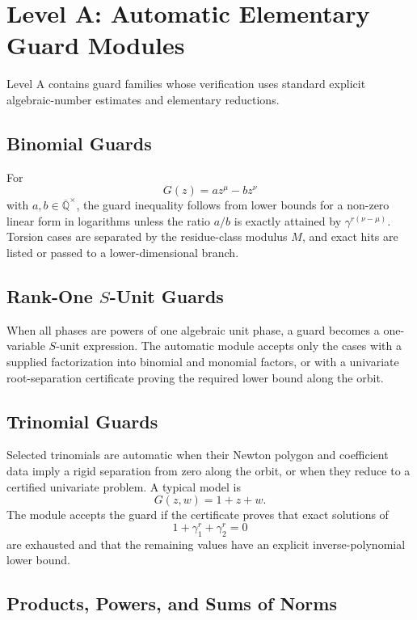 \documentclass[11pt]{article}
\begin{document}
\section{Level A: Automatic Elementary Guard Modules}

Level A contains guard families whose verification uses standard explicit algebraic-number estimates and elementary reductions.

\subsection{Binomial Guards}

For
\[
G(z)=a z^\mu-b z^\nu
\]
with \(a,b\in \overline{\mathbb Q}^{\times}\), the guard inequality follows from lower bounds for a non-zero linear form in logarithms unless the ratio \(a/b\) is exactly attained by \(\gamma^{r(\nu-\mu)}\). Torsion cases are separated by the residue-class modulus \(M\), and exact hits are listed or passed to a lower-dimensional branch.

\subsection{Rank-One \(S\)-Unit Guards}

When all phases are powers of one algebraic unit phase, a guard becomes a one-variable \(S\)-unit expression. The automatic module accepts only the cases with a supplied factorization into binomial and monomial factors, or with a univariate root-separation certificate proving the required lower bound along the orbit.

\subsection{Trinomial Guards}

Selected trinomials are automatic when their Newton polygon and coefficient data imply a rigid separation from zero along the orbit, or when they reduce to a certified univariate problem. A typical model is
\[
G(z,w)=1+z+w.
\]
The module accepts the guard if the certificate proves that exact solutions of
\[
1+\gamma_1^r+\gamma_2^r=0
\]
are exhausted and that the remaining values have an explicit inverse-polynomial lower bound.

\subsection{Products, Powers, and Sums of Norms}
\end{document}
